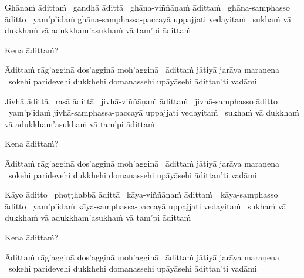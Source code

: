 \begin{pali-hang}
  Ghānaṁ ādittaṁ \breathmark\ gandhā ādittā \breathmark\ ghāna-viññāṇaṁ ādittaṁ \breathmark\ ghāna-samphasso āditto \breathmark\ yam'p'idaṁ ghāna-samphassa-paccayā uppajjati vedayitaṁ \breathmark\ sukhaṁ vā dukkhaṁ vā adukkham'asukhaṁ vā tam'pi ādittaṁ
\end{pali-hang}
\begin{pali-hang-together}
  Kena ādittaṁ?
\end{pali-hang-together}
\begin{pali-hang-together}
  Ādittaṁ rāg'agginā dos'agginā moh'agginā \breathmark\ ādittaṁ jātiyā jarāya maraṇena \breathmark\ sokehi paridevehi dukkhehi domanassehi upāyāsehi ādittan'ti vadāmi
\end{pali-hang-together}

\begin{pali-hang}
  Jivhā ādittā \breathmark\ rasā ādittā \breathmark\ jivhā-viññāṇaṁ ādittaṁ \breathmark\ jivhā-samphasso āditto \breathmark\ yam'p'idaṁ jivhā-samphassa-paccayā uppajjati vedayitaṁ \breathmark\ sukhaṁ vā dukkhaṁ vā adukkham'asukhaṁ vā tam'pi ādittaṁ
\end{pali-hang}
\begin{pali-hang-together}
  Kena ādittaṁ?
\end{pali-hang-together}
\begin{pali-hang-together}
  Ādittaṁ rāg'agginā dos'agginā moh'agginā \breathmark\ ādittaṁ jātiyā jarāya maraṇena \breathmark\ sokehi paridevehi dukkhehi domanassehi upāyāsehi ādittan'ti vadāmi
\end{pali-hang-together}

\begin{pali-hang}
  Kāyo āditto \breathmark\ phoṭṭhabbā ādittā \breathmark\ kāya-viññāṇaṁ \mbox{ādittaṁ}~\breathmark\ kāya-samphasso āditto \breathmark\ yam'p'idaṁ kāya-samphassa-paccayā uppajjati vedayitaṁ \breathmark\ sukhaṁ vā dukkhaṁ vā adukkham'asukhaṁ vā tam'pi ādittaṁ
\end{pali-hang}
\begin{pali-hang-together}
  Kena ādittaṁ?
\end{pali-hang-together}
\begin{pali-hang-together}
  Ādittaṁ rāg'agginā dos'agginā moh'agginā \breathmark\ ādittaṁ jātiyā jarāya maraṇena \breathmark\ sokehi paridevehi dukkhehi domanassehi upāyāsehi ādittan'ti vadāmi
\end{pali-hang-together}


